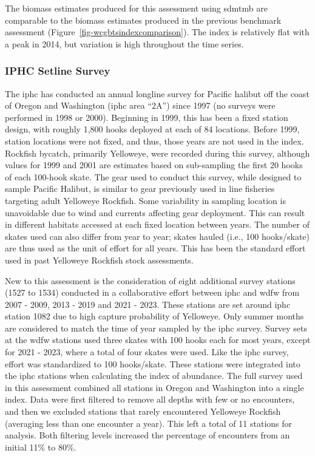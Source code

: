 \documentclass[
  english,
]{article}
\begin{document}
The biomass estimates produced for this assessment using \gls{sdmtmb}
are comparable to the biomass estimates produced in the previous
benchmark assessment (Figure~\ref{fig-wcgbtsindexcomparison}). The index
is relatively flat with a peak in 2014, but variation is high throughout
the time series.

\subsubsection{IPHC Setline Survey}\label{iphc-setline-survey}

The \gls{iphc} has conducted an annual longline survey for Pacific
halibut off the coast of Oregon and Washington (\gls{iphc} area ``2A'')
since 1997 (no surveys were performed in 1998 or 2000). Beginning in
1999, this has been a fixed station design, with roughly 1,800 hooks
deployed at each of 84 locations. Before 1999, station locations were
not fixed, and thus, those years are not used in the index. Rockfish
bycatch, primarily Yelloweye, were recorded during this survey, although
values for 1999 and 2001 are estimates based on sub-sampling the first
20 hooks of each 100-hook skate. The gear used to conduct this survey,
while designed to sample Pacific Halibut, is similar to gear previously
used in line fisheries targeting adult Yelloweye Rockfish. Some
variability in sampling location is unavoidable due to wind and currents
affecting gear deployment. This can result in different habitats
accessed at each fixed location between years. The number of skates used
can also differ from year to year; skates hauled (i.e., 100 hooks/skate)
are thus used as the unit of effort for all years. This has been the
standard effort used in past Yelloweye Rockfish stock assessments.

New to this assessment is the consideration of eight additional survey
stations (1527 to 1534) conducted in a collaborative effort between
\gls{iphc} and \gls{wdfw} from 2007 - 2009, 2013 - 2019 and 2021 - 2023.
These stations are set around \gls{iphc} station 1082 due to high
capture probability of Yelloweye. Only summer months are considered to
match the time of year sampled by the \gls{iphc} survey. Survey sets at
the \gls{wdfw} stations used three skates with 100 hooks each for most
years, except for 2021 - 2023, where a total of four skates were used.
Like the \gls{iphc} survey, effort was standardized to 100 hooks/skate.
These stations were integrated into the \gls{iphc} stations when
calculating the index of abundance. The full survey used in this
assessment combined all stations in Oregon and Washington into a single
index. Data were first filtered to remove all depths with few or no
encounters, and then we excluded stations that rarely encountered
Yelloweye Rockfish (averaging less than one encounter a year). This left
a total of 11 stations for analysis. Both filtering levels increased the
percentage of encounters from an initial 11\% to 80\%.
\end{document}
